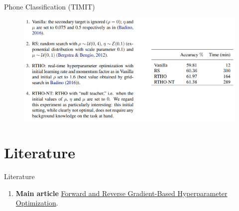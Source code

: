\documentclass{beamer}
\begin{document}
\begin{frame}{Phone Classification (TIMIT)}
    \begin{figure}
        \centering
        \includegraphics[scale=0.4]{images/example_2.png}
    \end{figure}
\end{frame}

\section{Literature}
\begin{frame}{Literature}
    \begin{enumerate}
        \item \textbf{Main article} \href{https://arxiv.org/pdf/1703.01785.pdf}
        {Forward and Reverse Gradient-Based Hyperparameter Optimization}.
    \end{enumerate}
\end{frame}
\end{document}
